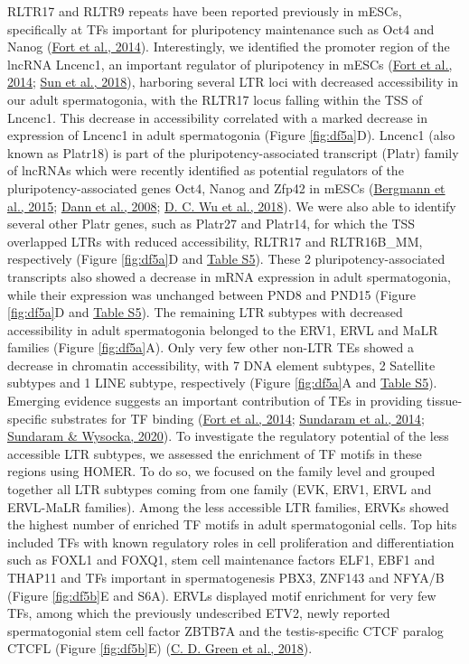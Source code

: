\documentclass[12pt,twoside]{reedthesis}
\begin{document}
RLTR17 and RLTR9 repeats have been reported previously in mESCs,
specifically at TFs important for pluripotency maintenance such as Oct4
and Nanog (\protect\hyperlink{ref-fort2014}{Fort et al., 2014}). Interestingly, we identified the promoter region
of the lncRNA Lncenc1, an important regulator of pluripotency in mESCs
(\protect\hyperlink{ref-fort2014}{Fort et al., 2014}; \protect\hyperlink{ref-sun2018}{Sun et al., 2018}), harboring several LTR loci with decreased
accessibility in our adult spermatogonia, with the RLTR17 locus falling
within the TSS of Lncenc1. This decrease in accessibility correlated
with a marked decrease in expression of Lncenc1 in adult spermatogonia
(Figure \ref{fig:df5a}D). Lncenc1 (also known as Platr18) is part of the
pluripotency-associated transcript (Platr) family of lncRNAs which were
recently identified as potential regulators of the
pluripotency-associated genes Oct4, Nanog and Zfp42 in mESCs (\protect\hyperlink{ref-bergmann2015}{Bergmann et al., 2015}; \protect\hyperlink{ref-dann2008}{Dann et al., 2008}; \protect\hyperlink{ref-wu2018}{D. C. Wu et al., 2018}). We were also able to identify several other
Platr genes, such as Platr27 and Platr14, for which the TSS overlapped
LTRs with reduced accessibility, RLTR17 and RLTR16B\_MM, respectively
(Figure \ref{fig:df5a}D and \protect\hyperlink{st}{Table S5}). These 2 pluripotency-associated transcripts also
showed a decrease in mRNA expression in adult spermatogonia, while their
expression was unchanged between PND8 and PND15 (Figure \ref{fig:df5a}D and \protect\hyperlink{st}{Table S5}).
The remaining LTR subtypes with decreased accessibility in adult
spermatogonia belonged to the ERV1, ERVL and MaLR families (Figure \ref{fig:df5a}A).
Only very few other non-LTR TEs showed a decrease in chromatin
accessibility, with 7 DNA element subtypes, 2 Satellite subtypes and 1
LINE subtype, respectively (Figure \ref{fig:df5a}A and \protect\hyperlink{st}{Table S5}). Emerging evidence
suggests an important contribution of TEs in providing tissue-specific
substrates for TF binding (\protect\hyperlink{ref-fort2014}{Fort et al., 2014}; \protect\hyperlink{ref-sundaram2014}{Sundaram et al., 2014}; \protect\hyperlink{ref-sundaram2020}{Sundaram \& Wysocka, 2020}). To
investigate the regulatory potential of the less accessible LTR
subtypes, we assessed the enrichment of TF motifs in these regions using
HOMER. To do so, we focused on the family level and grouped together all
LTR subtypes coming from one family (EVK, ERV1, ERVL and ERVL-MaLR
families). Among the less accessible LTR families, ERVKs showed the
highest number of enriched TF motifs in adult spermatogonial cells. Top
hits included TFs with known regulatory roles in cell proliferation and
differentiation such as FOXL1 and FOXQ1, stem cell maintenance factors
ELF1, EBF1 and THAP11 and TFs important in spermatogenesis PBX3, ZNF143
and NFYA/B (Figure \ref{fig:df5b}E and S6A). ERVLs displayed motif enrichment for very
few TFs, among which the previously undescribed ETV2, newly reported
spermatogonial stem cell factor ZBTB7A and the testis-specific CTCF
paralog CTCFL (Figure \ref{fig:df5b}E) (\protect\hyperlink{ref-green2018}{C. D. Green et al., 2018}).
\end{document}
